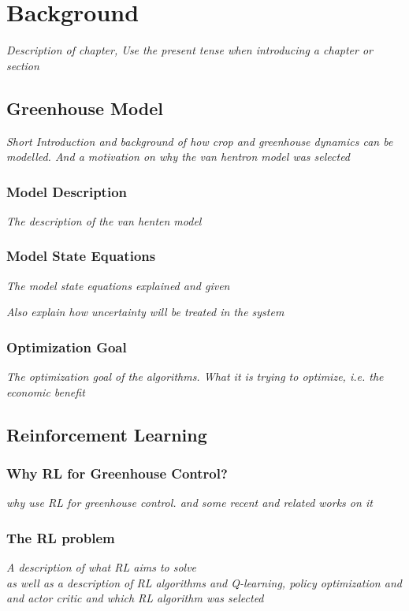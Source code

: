 \chapter{Background}
\label{chapter:Background}

\emph{Description of chapter, Use the present tense when introducing a chapter or section}

\section{Greenhouse Model}
\label{section:greenhouse-model}
\emph{Short Introduction and background of how crop and greenhouse dynamics can be modelled. And a motivation on why the van hentron model was selected}
\subsection{Model Description}
\emph{The description of the van henten model}

\subsection {Model State Equations}
\emph{The model state equations explained and given}

\emph{Also explain how uncertainty will be treated in the system}

\subsection{Optimization Goal}
\label{ssection:optimization-goal}
\emph{The optimization goal of the algorithms. What it is trying to optimize, i.e. the economic benefit}


\section{Reinforcement Learning}
\subsection{Why RL for Greenhouse Control?}
\emph{why use RL for greenhouse control. and some recent and related works on it}

\subsection{The RL problem}
\emph{A description of what RL aims to solve \\ as well as a description of RL algorithms and Q-learning, policy optimization and and actor critic and which RL algorithm was selected}

